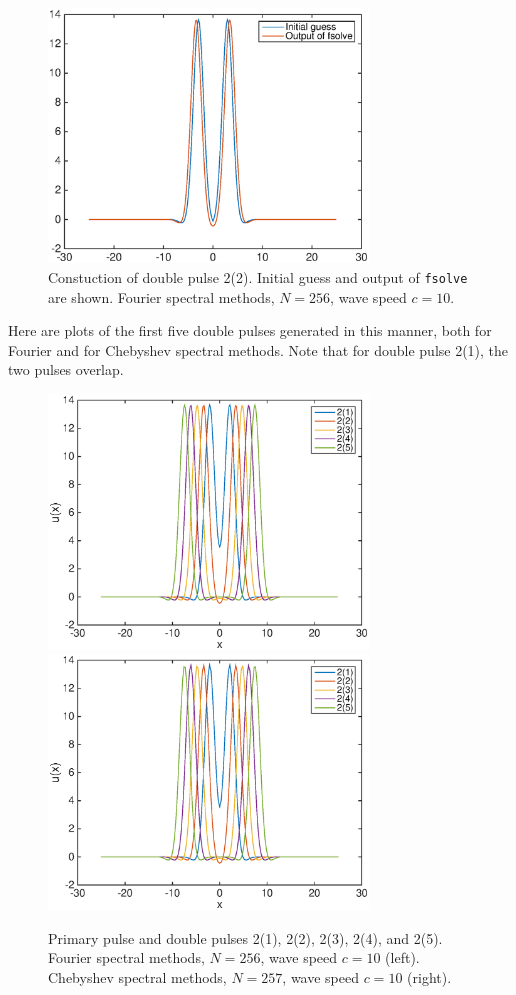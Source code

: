 \documentclass[12pt]{article}
\begin{document}
\begin{figure}[H]
	\includegraphics[width=8.5cm]{doublepulseconstruction}
	\caption{Constuction of double pulse 2(2). Initial guess and output of \texttt{fsolve} are shown. Fourier spectral methods, $N = 256$, wave speed $c = 10$.}
\end{figure}

Here are plots of the first five double pulses generated in this manner, both for Fourier and for Chebyshev spectral methods. Note that for double pulse 2(1), the two pulses overlap.

\begin{figure}[H]
	\includegraphics[width=8.5cm]{four10double.eps}
	\includegraphics[width=8.5cm]{cheb10double}
	\caption{Primary pulse and double pulses 2(1), 2(2), 2(3), 2(4), and 2(5). Fourier spectral methods, $N = 256$, wave speed $c = 10$ (left). Chebyshev spectral methods, $N = 257$, wave speed $c = 10$ (right). }
\end{figure}
\end{document}
